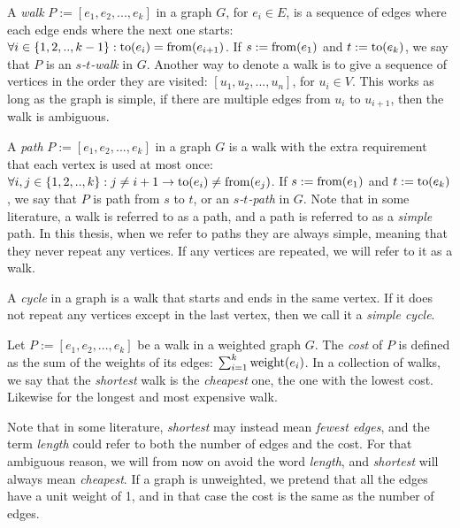 
\begin{definition}[Walk]
    A \emph{walk} $P := [e_1, e_2, ..., e_k]$ in a graph $G$, for $e_i \in E$, is a sequence of edges where each edge ends where the next one starts: $\forall i \in \{1,2,..,k-1\} : \operatorname{to}(e_i) = \operatorname{from}(e_{i+1})$.
    If $s := \operatorname{from}(e_1)$ and $t := \operatorname{to}(e_k)$, we say that $P$ is an \emph{$s$-$t$-walk} in $G$.
    Another way to denote a walk is to give a sequence of vertices in the order they are visited: $[u_1, u_2, ..., u_n]$, for $u_i \in V$. This works as long as the graph is simple, if there are multiple edges from $u_i$ to $u_{i+1}$, then the walk is ambiguous.
\end{definition}

\begin{definition}[Path]
    A \emph{path} $P := [e_1, e_2, ..., e_k]$ in a graph $G$ is a walk with the extra requirement that each vertex is used at most once: $\forall i, j \in \{1,2,..,k\} : j \neq {i+1} \rightarrow \operatorname{to}(e_i) \neq \operatorname{from}(e_j)$.
    If $s := \operatorname{from}(e_1)$ and $t := \operatorname{to}(e_k)$, we say that $P$ is path from $s$ to $t$, or an \emph{$s$-$t$-path} in $G$.
    Note that in some literature, a walk is referred to as a path, and a path is referred to as a \emph{simple} path. In this thesis, when we refer to paths they are always simple, meaning that they never repeat any vertices. If any vertices are repeated, we will refer to it as a walk.    
\end{definition}

\begin{definition}[Cycle]
    A \emph{cycle} in a graph is a walk that starts and ends in the same vertex. If it does not repeat any vertices except in the last vertex, then we call it a \emph{simple cycle}.
\end{definition}

\begin{definition}
    Let $P := [e_1, e_2, ..., e_k]$ be a walk in a weighted graph $G$. The \emph{cost} of $P$ is defined as the sum of the weights of its edges: $\sum_{i=1}^k \operatorname{weight}(e_i)$. In a collection of walks, we say that the \emph{shortest} walk is the \emph{cheapest} one, the one with the lowest cost. Likewise for the longest and most expensive walk. 

    Note that in some literature, \emph{shortest} may instead mean \emph{fewest edges}, and the term \emph{length} could refer to both the number of edges and the cost. For that ambiguous reason, we will from now on avoid the word \emph{length}, and \emph{shortest} will always mean \emph{cheapest}. If a graph is unweighted, we pretend that all the edges have a unit weight of 1, and in that case the cost is the same as the number of edges.
\end{definition}

